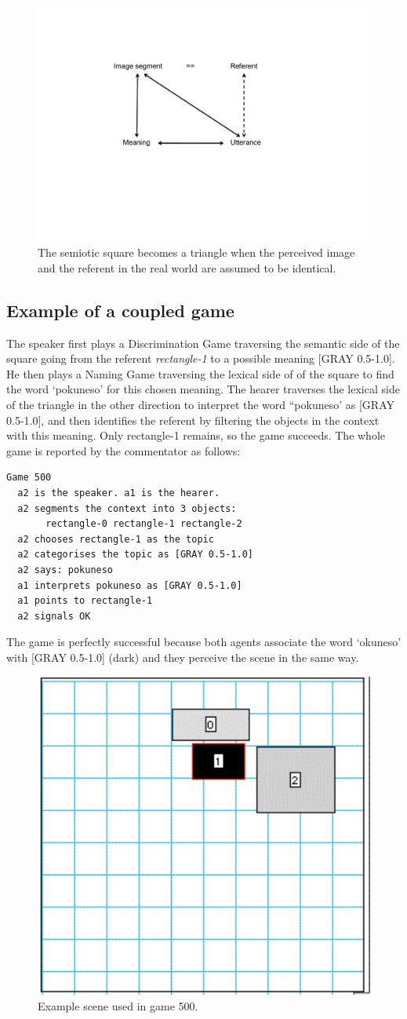 \begin{figure}[htbp]
  \centerline{\includegraphics[width=.50\textwidth]{chap6/figs/square6}}
\caption{\label{square6} The semiotic square becomes
a triangle when the perceived image and the referent in the
real world are assumed to be identical.} 
\end{figure}

\subsection{Example of a coupled game}

The speaker first plays a Discrimination Game traversing the 
semantic side of the square going from the referent 
{\itshape rectangle-1} to a possible meaning [GRAY 0.5-1.0]. 
He then plays a Naming Game traversing the lexical side of 
of the square to find the word `pokuneso' for this chosen meaning. 
The hearer traverses the lexical side of the triangle in 
the other direction to interpret the word ``pokuneso' as
{}[GRAY 0.5-1.0], and then identifies the referent by 
filtering the objects in the context with this meaning. 
Only rectangle-1 remains, so the game succeeds. 
The whole game is reported by the commentator as follows: 
\begin{verbatim}
Game 500
  a2 is the speaker. a1 is the hearer. 
  a2 segments the context into 3 objects: 
       rectangle-0 rectangle-1 rectangle-2
  a2 chooses rectangle-1 as the topic 
  a2 categorises the topic as [GRAY 0.5-1.0]
  a2 says: pokuneso
  a1 interprets pokuneso as [GRAY 0.5-1.0]
  a1 points to rectangle-1
  a2 signals OK 
\end{verbatim}
The game is perfectly successful because both 
agents associate the word `okuneso' with 
{}[GRAY 0.5-1.0] (dark) and they perceive the scene 
in the same way.


\begin{figure}[htbp]
  \centerline{\includegraphics[width=.40\textwidth]{chap6/figs/recscene}}
\caption{\label{rect1} Example scene used
in game 500.}
\end{figure}



